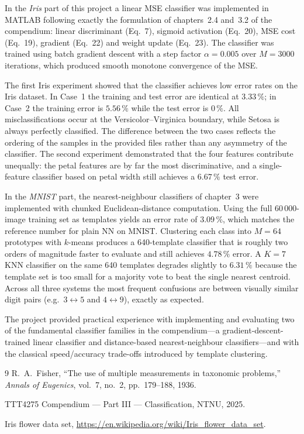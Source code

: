 \documentclass[11pt,a4paper]{article}
\begin{document}
In the \emph{Iris} part of this project a linear MSE classifier was implemented in MATLAB following exactly the formulation of chapters~2.4 and~3.2 of the compendium: linear discriminant (Eq.~7), sigmoid activation (Eq.~20), MSE cost (Eq.~19), gradient (Eq.~22) and weight update (Eq.~23). The classifier was trained using batch gradient descent with a step factor $\alpha = 0.005$ over $M = 3000$ iterations, which produced smooth monotone convergence of the MSE.

The first Iris experiment showed that the classifier achieves low error rates on the Iris dataset. In Case~1 the training and test error are identical at $3.33\,\%$; in Case~2 the training error is $5.56\,\%$ while the test error is $0\,\%$. All misclassifications occur at the Versicolor--Virginica boundary, while Setosa is always perfectly classified. The difference between the two cases reflects the ordering of the samples in the provided files rather than any asymmetry of the classifier. The second experiment demonstrated that the four features contribute unequally: the petal features are by far the most discriminative, and a single-feature classifier based on petal width still achieves a $6.67\,\%$ test error.

In the \emph{MNIST} part, the nearest-neighbour classifiers of chapter~3 were implemented with chunked Euclidean-distance computation. Using the full 60\,000-image training set as templates yields an error rate of $3.09\,\%$, which matches the reference number for plain NN on MNIST. Clustering each class into $M=64$ prototypes with $k$-means produces a 640-template classifier that is roughly two orders of magnitude faster to evaluate and still achieves $4.78\,\%$ error. A $K=7$ KNN classifier on the same 640 templates degrades slightly to $6.31\,\%$ because the template set is too small for a majority vote to beat the single nearest centroid. Across all three systems the most frequent confusions are between visually similar digit pairs (e.g.\ $3\leftrightarrow 5$ and $4\leftrightarrow 9$), exactly as expected.

The project provided practical experience with implementing and evaluating two of the fundamental classifier families in the compendium---a gradient-descent-trained linear classifier and distance-based nearest-neighbour classifiers---and with the classical speed/accuracy trade-offs introduced by template clustering.

\begin{thebibliography}{9}
R.~A.~Fisher, ``The use of multiple measurements in taxonomic problems,'' \textit{Annals of Eugenics}, vol.~7, no.~2, pp.~179--188, 1936.

TTT4275 Compendium --- Part III --- Classification, NTNU, 2025.

Iris flower data set, \url{https://en.wikipedia.org/wiki/Iris_flower_data_set}.
\end{thebibliography}
\end{document}
